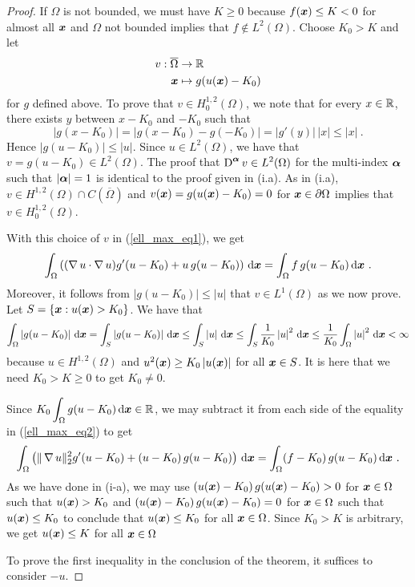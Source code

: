 \begin{proof}
If $\Omega$ is not bounded, we must have $K\geq 0$ because
$f({\bm{x}}) \leq K<0$ for almost all ${\bm{x}}$ and
$\Omega$ not bounded implies that $\displaystyle f \not\in L^2(\Omega)$.
Choose $K_0 > K$ and let
\begin{align*}
v: \overline{\Omega} & \rightarrow \mathbb{R} \\
{\bm{x}} &\mapsto g(u({\bm{x}})-K_0)
\end{align*}
for $g$ defined above.  To prove that $\displaystyle v\in H^{1,2}_0(\Omega)$, we
note that for every $x \in \mathbb{R}$, there exists $y$ between $x-K_0$ and
$-K_0$ such that
\[
\left|g(x-K_0)\right| = \left|g(x-K_0) - g(-K_0)\right| =
|g'(y)|\,|x| \leq |x| \ .
\]
Hence $|g(u-K_0)| \leq |u|$.  Since $\displaystyle u \in L^2(\Omega)$,
we have that $\displaystyle v = g(u-K_0) \in L^2(\Omega)$.  The proof that
$\displaystyle \operatorname{D}^{{\bm{\alpha}}} v \in L^2(\Omega)$ for the multi-index
${\bm{\alpha}}$ such that $|{\bm{\alpha}}|=1$ is identical to the proof
given in (i.a).
As in (i.a), $\displaystyle v\in H^{1,2}(\Omega) \cap C(\overline{\Omega})$ and
$v({\bm{x}}) = g(u({\bm{x}})-K_0) = 0$ for ${\bm{x}}\in \partial \Omega$
implies that $\displaystyle v\in H^{1,2}_0(\Omega)$.

With this choice of $v$ in (\ref{ell_max_eq1}), we get
\begin{equation} \label{ell_max_eq2}
\int_\Omega \left( (\operatorname{\nabla} u \cdot \operatorname{\nabla} u ) g'(u-K_0) 
+ u \, g(u-K_0) \right) \,\mathrm{d}{{\bm{x}}} = \int_\Omega f\,g(u-K_0)
\,\mathrm{d}{{\bm{x}}} \ .
\end{equation}
Moreover, it follows from $|g(u-K_0)| \leq |u|$ that
$v \in L^1(\Omega)$ as we now prove.  Let
$\displaystyle S = \left\{ {\bm{x}} : u({\bm{x}}) > K_0 \right\}$.  We
have that
\[
\int_\Omega \left|g(u-K_0)\right| \,\mathrm{d}{{\bm{x}}}
= \int_S \left|g(u-K_0)\right| \,\mathrm{d}{{\bm{x}}}
\leq \int_S \left|u\right| \,\mathrm{d}{{\bm{x}}}
\leq \int_S \frac{1}{K_0} \left|u\right|^2 \,\mathrm{d}{{\bm{x}}}
\leq \frac{1}{K_0} \int_\Omega \left|u\right|^2 \,\mathrm{d}{{\bm{x}}} < \infty
\]
because $u \in H^{1,2}(\Omega)$ and
$u^2({\bm{x}})\geq K_0 \left|u({\bm{x}})\right|$ for all ${\bm{x}} \in S$.
It is here that we need $K_0>K\geq 0$ to get $K_0 \neq 0$.

Since $\displaystyle K_0 \int_\Omega g(u-K_0) \,\mathrm{d}{{\bm{x}}} \in \mathbb{R}$, we may
subtract it from each side of the equality in (\ref{ell_max_eq2}) to get
\[
\int_\Omega \left( \|\operatorname{\nabla} u\|_2^2 g'(u-K_0) 
+ (u-K_0) \, g(u-K_0) \right) \,\mathrm{d}{{\bm{x}}} = \int_\Omega (f-K_0)\,g(u-K_0)
\,\mathrm{d}{{\bm{x}}} \ .
\]
As we have done in (i-a), we may use
$(u({\bm{x}})-K_0) \, g(u({\bm{x}})-K_0) > 0$ for
${\bm{x}} \in \Omega$ such that $u({\bm{x}})>K_0$ and
$(u({\bm{x}})-K_0) \, g(u({\bm{x}})-K_0) = 0$ for
${\bm{x}} \in \Omega$ such that $u({\bm{x}})\leq K_0$ to conclude that
$u({\bm{x}}) \leq K_0$ for all ${\bm{x}}\in \Omega$.  Since $K_0>K$ is
arbitrary, we get $u({\bm{x}}) \leq K$ for all ${\bm{x}}\in \Omega$

 To prove the first inequality in the conclusion of the
theorem, it suffices to consider $-u$.
\end{proof}

